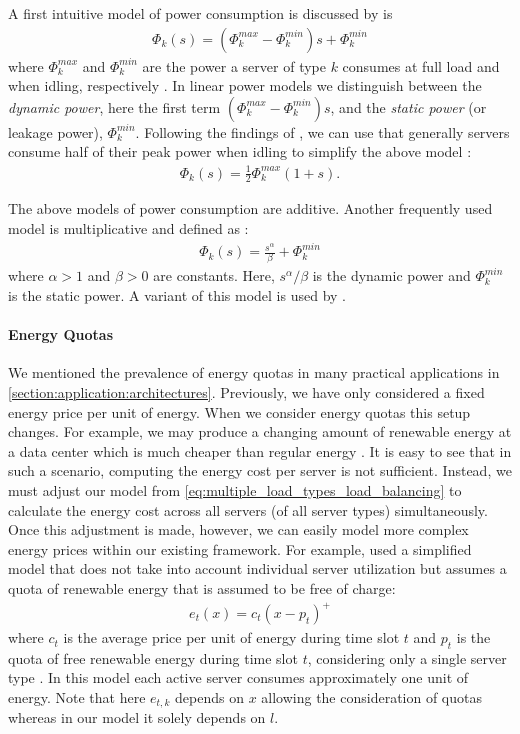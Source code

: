 A first intuitive model of power consumption is discussed by \citeauthor*{Dayarathna2016, Ismail2020} is \begin{align*}
    \Phi_k(s) = (\Phi_k^{max} - \Phi_k^{min})s + \Phi_k^{min}
\end{align*} where $\Phi_k^{max}$ and $\Phi_k^{min}$ are the power a server of type $k$ consumes at full load and when idling, respectively \cite{Dayarathna2016, Ismail2020}. In linear power models we distinguish between the \textit{dynamic power}, here the first term $(\Phi_k^{max} - \Phi_k^{min})s$, and the \textit{static power} (or leakage power), $\Phi_k^{min}$. Following the findings of \citeauthor*{Barroso2007}, we can use that generally servers consume half of their peak power when idling to simplify the above model \cite{Barroso2007, Ismail2020}: \begin{align*}
    \Phi_k(s) = \frac{1}{2} \Phi_k^{max} (1 + s).
\end{align*}

The above models of power consumption are additive. Another frequently used model is multiplicative and defined as \cite{Dayarathna2016}: \begin{align*}
    \Phi_k(s) = \frac{s^{\alpha}}{\beta} + \Phi_k^{min}
\end{align*} where $\alpha > 1$ and $\beta > 0$ are constants. Here, $s^{\alpha}/\beta$ is the dynamic power and $\Phi_k^{min}$ is the static power. A variant of this model is used by \citeauthor*{Bansal2015} \cite{Bansal2015}.

\paragraph{Energy Quotas} We mentioned the prevalence of energy quotas in many practical applications in \autoref{section:application:architectures}. Previously, we have only considered a fixed energy price per unit of energy. When we consider energy quotas this setup changes. For example, we may produce a changing amount of renewable energy at a data center which is much cheaper than regular energy \cite{Lin2012}. It is easy to see that in such a scenario, computing the energy cost per server is not sufficient. Instead, we must adjust our model from \autoref{eq:multiple_load_types_load_balancing} to calculate the energy cost across all servers (of all server types) simultaneously. Once this adjustment is made, however, we can easily model more complex energy prices within our existing framework. For example, \citeauthor*{Lin2012} used a simplified model that does not take into account individual server utilization but assumes a quota of renewable energy that is assumed to be free of charge: \begin{align*}
    e_t(x) = c_{t}(x - p_t)^+
\end{align*} where $c_t$ is the average price per unit of energy during time slot $t$ and $p_t$ is the quota of free renewable energy during time slot $t$, considering only a single server type \cite{Lin2012}. In this model each active server consumes approximately one unit of energy. Note that here $e_{t,k}$ depends on $x$ allowing the consideration of quotas whereas in our model it solely depends on $l$.


